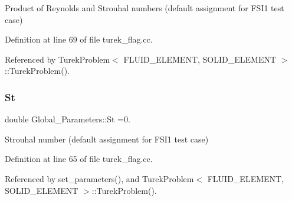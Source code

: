 Product of Reynolds and Strouhal numbers (default assignment for F\+S\+I1 test case) 



Definition at line 69 of file turek\+\_\+flag.\+cc.



Referenced by Turek\+Problem$<$ F\+L\+U\+I\+D\+\_\+\+E\+L\+E\+M\+E\+N\+T, S\+O\+L\+I\+D\+\_\+\+E\+L\+E\+M\+E\+N\+T $>$\+::\+Turek\+Problem().

\mbox{\label{namespaceGlobal__Parameters_af1af40a0df651e86bc1be273fafa98da}} 
\subsubsection{\texorpdfstring{St}{St}}
{\footnotesize\ttfamily double Global\+\_\+\+Parameters\+::\+St =0.}



Strouhal number (default assignment for F\+S\+I1 test case) 



Definition at line 65 of file turek\+\_\+flag.\+cc.



Referenced by set\+\_\+parameters(), and Turek\+Problem$<$ F\+L\+U\+I\+D\+\_\+\+E\+L\+E\+M\+E\+N\+T, S\+O\+L\+I\+D\+\_\+\+E\+L\+E\+M\+E\+N\+T $>$\+::\+Turek\+Problem().

